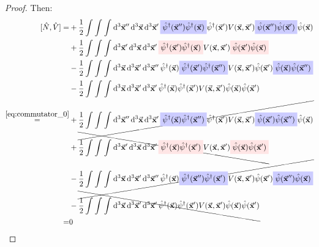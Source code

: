 \documentclass[11pt, a4paper, twoside, openright]{article}
\begin{document}
\begin{proof}
Then:
\begin{equation*}
\begin{split}
  [\hat{N},\hat{V}  ]
      = &
      +\frac{1}{2} \int_{}^{} \int_{}^{} \int_{}^{} \dd[3]{\va{x}''} \dd[3]{\va{x}}  \dd[3]{\va{x}'}
     \mathcolorbox{blue!20}{\hat{\psi }^\dag (\va{x}'')   \hat{\psi } ^\dag (\va{x})}  \hat{\psi } ^\dag (\va{x}')  V (\va{x},\va{x}')   \mathcolorbox{blue!20}{\hat{\psi }(\va{x}'')  \hat{\psi } (\va{x}')} \hat{\psi } (\va{x}) \\
     &+
     \frac{1}{2} \int_{}^{} \int_{}^{} \int_{}^{} \dd[3]{\va{x}'} \dd[3]{\va{x}}  \dd[3]{\va{x}'}
     \mathcolorbox{pink!40}{\hat{\psi }^\dag (\va{x}')   \hat{\psi } ^\dag (\va{x})} V (\va{x},\va{x}') \mathcolorbox{pink!40}{\hat{\psi } (\va{x}') \hat{\psi } (\va{x})}\\
     &-
     \frac{1}{2} \int_{}^{} \int_{}^{} \int_{}^{} \dd[3]{\va{x}} \dd[3]{\va{x}'} \dd[3]{\va{x}''}
     \hat{\psi } ^\dag (\va{x})
     \mathcolorbox{blue!20}{\hat{\psi } ^\dag (\va{x}')    \hat{\psi }^\dag (\va{x}'')}   V (\va{x},\va{x}')  \hat{\psi } (\va{x}') \mathcolorbox{blue!20}{\hat{\psi } (\va{x}) \hat{\psi }(\va{x}'')} \\
     &-
     \frac{1}{2} \int_{}^{} \int_{}^{} \int_{}^{} \dd[3]{\va{x}} \dd[3]{\va{x}'} \dd[3]{\va{x}'}
     \hat{\psi } ^\dag (\va{x})
     \hat{\psi } ^\dag (\va{x}') V (\va{x},\va{x}') \hat{\psi } (\va{x}) \hat{\psi }(\va{x}') \\
     \overset{\eqref{eq:commutator_0}}{=} &
     +
     \cancel{ \frac{1}{2} \int_{}^{} \int_{}^{} \int_{}^{} \dd[3]{\va{x}''} \dd[3]{\va{x}}  \dd[3]{\va{x}'}
    \mathcolorbox{blue!20}{  \hat{\psi } ^\dag (\va{x}) \hat{\psi }^\dag (\va{x}'') }  \hat{\psi } ^\dag (\va{x}')  V (\va{x},\va{x}')   \mathcolorbox{blue!20}{  \hat{\psi } (\va{x}') \hat{\psi }(\va{x}'') } \hat{\psi } (\va{x})
    }\\
    &+
    \bcancel{
    \frac{1}{2} \int_{}^{} \int_{}^{} \int_{}^{} \dd[3]{\va{x}'} \dd[3]{\va{x}}  \dd[3]{\va{x}'}
    \mathcolorbox{pink!40}{ \hat{\psi } ^\dag (\va{x}) \hat{\psi }^\dag (\va{x}')  } V (\va{x},\va{x}') \mathcolorbox{pink!40}{\hat{\psi } (\va{x}) \hat{\psi } (\va{x}')}
    }\\
    &-
    \cancel{
    \frac{1}{2} \int_{}^{} \int_{}^{} \int_{}^{} \dd[3]{\va{x}} \dd[3]{\va{x}'} \dd[3]{\va{x}''}
    \hat{\psi } ^\dag (\va{x})
    \mathcolorbox{blue!20}{ \hat{\psi }^\dag (\va{x}'') \hat{\psi } ^\dag (\va{x}') }   V (\va{x},\va{x}')  \hat{\psi } (\va{x}') \mathcolorbox{blue!20}{ \hat{\psi }(\va{x}'') \hat{\psi } (\va{x}) }
    }\\
    &-
    \bcancel{
    \frac{1}{2} \int_{}^{} \int_{}^{} \int_{}^{} \dd[3]{\va{x}} \dd[3]{\va{x}'} \dd[3]{\va{x}'}
    \hat{\psi } ^\dag (\va{x})
    \hat{\psi } ^\dag (\va{x}') V (\va{x},\va{x}') \hat{\psi } (\va{x}) \hat{\psi }(\va{x}')
    } \\
    =& 0
\end{split}
\end{equation*}



\end{proof}
\end{document}
